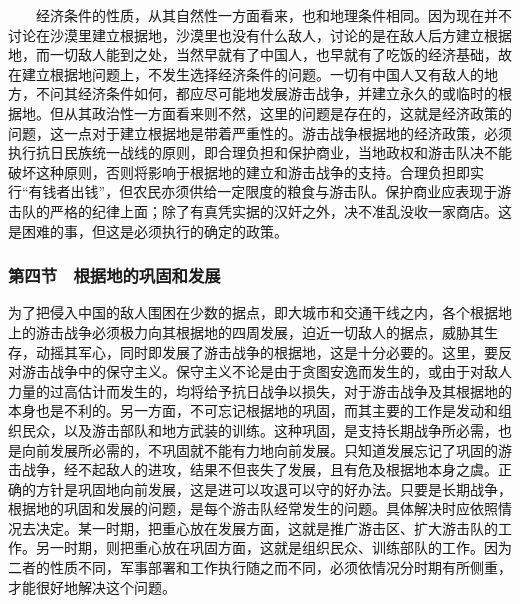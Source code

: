\documentclass[cn,11pt,chinese]{elegantbook}
\def\myformat#1{\hfil\hfil #1}
\begin{document}
　　经济条件的性质，从其自然性一方面看来，也和地理条件相同。因为现在并不讨论在沙漠里建立根据地，沙漠里也没有什么敌人，讨论的是在敌人后方建立根据地，而一切敌人能到之处，当然早就有了中国人，也早就有了吃饭的经济基础，故在建立根据地问题上，不发生选择经济条件的问题。一切有中国人又有敌人的地方，不问其经济条件如何，都应尽可能地发展游击战争，并建立永久的或临时的根据地。但从其政治性一方面看来则不然，这里的问题是存在的，这就是经济政策的问题，这一点对于建立根据地是带着严重性的。游击战争根据地的经济政策，必须执行抗日民族统一战线的原则，即合理负担和保护商业，当地政权和游击队决不能破坏这种原则，否则将影响于根据地的建立和游击战争的支持。合理负担即实行“有钱者出钱”，但农民亦须供给一定限度的粮食与游击队。保护商业应表现于游击队的严格的纪律上面；除了有真凭实据的汉奸之外，决不准乱没收一家商店。这是困难的事，但这是必须执行的确定的政策。\\
\subsubsection*{\myformat{第四节　根据地的巩固和发展}}
为了把侵入中国的敌人围困在少数的据点，即大城市和交通干线之内，各个根据地上的游击战争必须极力向其根据地的四周发展，迫近一切敌人的据点，威胁其生存，动摇其军心，同时即发展了游击战争的根据地，这是十分必要的。这里，要反对游击战争中的保守主义。保守主义不论是由于贪图安逸而发生的，或由于对敌人力量的过高估计而发生的，均将给予抗日战争以损失，对于游击战争及其根据地的本身也是不利的。另一方面，不可忘记根据地的巩固，而其主要的工作是发动和组织民众，以及游击部队和地方武装的训练。这种巩固，是支持长期战争所必需，也是向前发展所必需的，不巩固就不能有力地向前发展。只知道发展忘记了巩固的游击战争，经不起敌人的进攻，结果不但丧失了发展，且有危及根据地本身之虞。正确的方针是巩固地向前发展，这是进可以攻退可以守的好办法。只要是长期战争，根据地的巩固和发展的问题，是每个游击队经常发生的问题。具体解决时应依照情况去决定。某一时期，把重心放在发展方面，这就是推广游击区、扩大游击队的工作。另一时期，则把重心放在巩固方面，这就是组织民众、训练部队的工作。因为二者的性质不同，军事部署和工作执行随之而不同，必须依情况分时期有所侧重，才能很好地解决这个问题。\\
\end{document}
